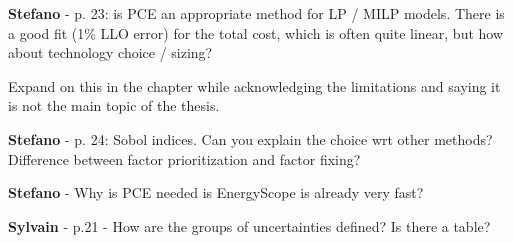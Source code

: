 \documentclass[12pt,a4paper]{article}
\begin{document}
\noindent 

\begin{mdframed}[style=manuscript] %

\end{mdframed}

\begin{mdframed}[style=comment] %
{\color{orange} \textbf{Stefano}} - p. 23: is PCE an appropriate method for LP / MILP models. There is a good fit (1\% LLO error) for the total cost, which is often quite linear, but how about technology choice / sizing?
\end{mdframed}

\noindent Expand on this in the chapter while acknowledging the limitations and saying it is not the main topic of the thesis. 

\begin{mdframed}[style=manuscript] %

\end{mdframed}

\begin{mdframed}[style=comment] %
{\color{orange} \textbf{Stefano}} - p. 24: Sobol indices. Can you explain the choice wrt other methods? Difference between factor prioritization and factor fixing?
\end{mdframed}

\noindent 

\begin{mdframed}[style=manuscript] %

\end{mdframed}

\begin{mdframed}[style=comment] %
{\color{orange} \textbf{Stefano}} - Why is PCE needed is EnergyScope is already very fast?
\end{mdframed}

\noindent 

\begin{mdframed}[style=manuscript] %

\end{mdframed}

\begin{mdframed}[style=comment] %
{\color{purple} \textbf{Sylvain}} - p.21 - How are the groups of uncertainties defined? Is there a table?
\end{mdframed}
\end{document}
